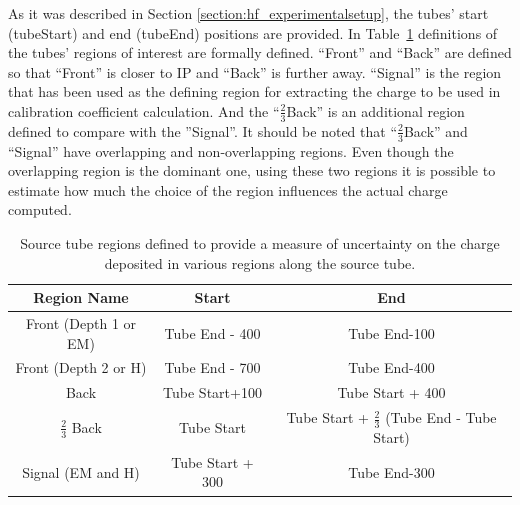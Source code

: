 As it was described in Section \ref{section:hf_experimentalsetup}, the tubes' start (tubeStart) and end (tubeEnd) positions are provided. In Table~\ref{tab:TubeRegions} definitions of the tubes' regions of interest are formally defined. ``Front'' and ``Back'' are defined so that ``Front'' is closer to IP and ``Back'' is further away. ``Signal'' is the region that has been used as the defining region for extracting
the charge to be used in calibration coefficient calculation. And the ``$\frac{2}{3}$Back''
is an additional region defined to compare with the ''Signal''. It should be
noted that ``$\frac{2}{3}$Back'' and ``Signal'' have overlapping and non-overlapping
regions. Even though the overlapping region is the dominant one, using these two regions it is possible to estimate how much the choice of the region influences the actual charge computed.
\begin{table}[!h]
    \centering
    \caption{Source tube regions defined to provide a measure of uncertainty on
    the charge deposited in various regions along the source tube.}
    \begin{tabular}{|c|c|c|}
    \hline
    Region Name & Start & End \\
    \hline
    Front (Depth 1 or EM) & Tube End - 400 & Tube End-100 \\
    Front (Depth 2 or H) & Tube End - 700 & Tube End-400 \\
    Back & Tube Start+100 & Tube Start + 400 \\
    $\frac{2}{3}$ Back & Tube Start & Tube Start + $\frac{2}{3}$ (Tube End - Tube Start) \\
    Signal (EM and H) & Tube Start + 300 & Tube End-300 \\
    \hline
    \end{tabular}
    \label{tab:TubeRegions}
\end{table}


